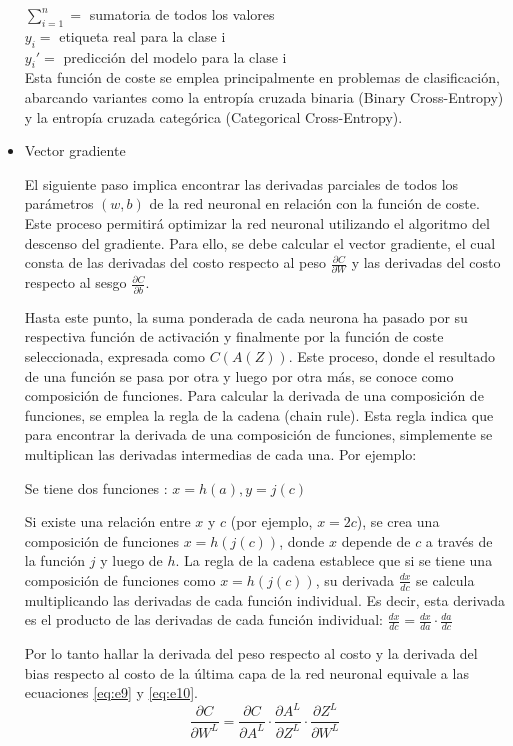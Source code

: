 \begin{itemize}
$\sum_{i=1}^{n} =$ sumatoria de todos los valores\\
$y_{i} =$ etiqueta real para la clase i\\
$y_{i}' =$ predicción del modelo para la clase i\\

Esta función de coste se emplea principalmente en problemas de clasificación, abarcando variantes como la entropía cruzada binaria (Binary Cross-Entropy) y la entropía cruzada categórica (Categorical Cross-Entropy).

	\item Vector gradiente
	
	
El siguiente paso implica encontrar las derivadas parciales de todos los parámetros $(w, b)$ de la red neuronal en relación con la función de coste. Este proceso permitirá optimizar la red neuronal utilizando el algoritmo del descenso del gradiente. Para ello, se debe calcular el vector gradiente, el cual consta de las derivadas del costo respecto al peso $\frac{\partial C}{\partial W}$ y las derivadas del costo respecto al sesgo $\frac{\partial C}{\partial b}$.

Hasta este punto, la suma ponderada de cada neurona ha pasado por su respectiva función de activación y finalmente por la función de coste seleccionada, expresada como $C(A(Z))$. Este proceso, donde el resultado de una función se pasa por otra y luego por otra más, se conoce como composición de funciones. Para calcular la derivada de una composición de funciones, se emplea la regla de la cadena (chain rule). Esta regla indica que para encontrar la derivada de una composición de funciones, simplemente se multiplican las derivadas intermedias de cada una. Por ejemplo:

Se tiene dos funciones : $x= h(a) , y= j(c)$

Si existe una relación entre $x$ y $c$ (por ejemplo, $x=2c$), se crea una composición de funciones $x=h(j(c))$, donde $x$ depende de $c$ a través de la función $j$ y luego de $h$.
La regla de la cadena establece que si se tiene una composición de funciones como $x=h(j(c))$, su derivada $\frac{dx}{dc}$ se calcula multiplicando las derivadas de cada función individual.
Es decir, esta derivada es el producto de las derivadas de cada función individual: $\frac{dx}{dc} = \frac{dx}{da} \cdot \frac{da}{dc}$

Por lo tanto hallar la derivada del peso respecto al costo y la derivada del bias respecto al costo de la última capa de la red neuronal equivale a las ecuaciones \ref{eq:e9} y \ref{eq:e10}.
\begin{equation} \label{eq:e9} 
	\frac{\partial C}{\partial W^L}=\frac{\partial C}{\partial A^L}\cdot \frac{\partial A^L }{\partial Z^L}\cdot \frac{\partial Z^L }{\partial W^L}
\end{equation}


\end{itemize}
